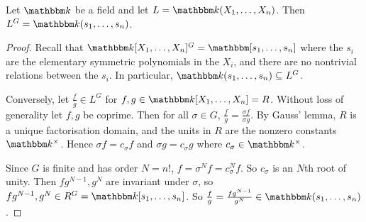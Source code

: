 \begin{theorem}
	Let \( \mathbbm k \) be a field and let \( L = \mathbbm k(X_1, \dots, X_n) \).
	Then \( L^G = \mathbbm k(s_1, \dots, s_n) \).
\end{theorem}
\begin{proof}
	Recall that \( \mathbbm k[X_1, \dots, X_n]^G = \mathbbm[s_1, \dots, s_n] \) where the \( s_i \) are the elementary symmetric polynomials in the \( X_i \), and there are no nontrivial relations between the \( s_i \).
	In particular, \( \mathbbm k(s_1, \dots, s_n) \subseteq L^G \).

	Conversely, let \( \frac{f}{g} \in L^G \) for \( f, g \in \mathbbm k[X_1, \dots, X_n] = R \).
	Without loss of generality let \( f, g \) be coprime.
	Then for all \( \sigma \in G \), \( \frac{f}{g} = \frac{\sigma f}{\sigma g} \).
	By Gauss' lemma, \( R \) is a unique factorisation domain, and the units in \( R \) are the nonzero constants \( \mathbbm k^\times \).
	Hence \( \sigma f = c_\sigma f \) and \( \sigma g = c_\sigma g \) where \( c_\sigma \in \mathbbm k^\times \).

	Since \( G \) is finite and has order \( N = n! \), \( f = \sigma^N f = c_\sigma^N f \).
	So \( c_\sigma \) is an \( N \)th root of unity.
	Then \( fg^{N-1}, g^N \) are invariant under \( \sigma \), so \( fg^{N-1}, g^N \in R^G = \mathbbm k[s_1, \dots, s_n] \).
	So \( \frac{f}{g} = \frac{fg^{N-1}}{g^N} \in \mathbbm k(s_1, \dots, s_n) \).
\end{proof}
